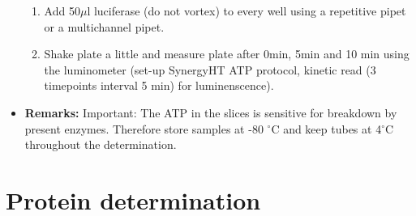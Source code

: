 \documentclass{EU-report}
\begin{document}
\begin{itemize}
\begin{enumerate}
\item Add 50$\mu$l luciferase (do not vortex) to every well using a repetitive pipet or a multichannel pipet.
\item Shake plate a little and measure plate after 0min, 5min and 10 min using the luminometer (set-up SynergyHT ATP protocol, kinetic read (3 timepoints interval 5 min) for luminenscence).
\end{enumerate}
\item \textbf{Remarks:} Important: The ATP in the slices is sensitive for breakdown by present enzymes. Therefore store samples at -80 $^{\circ}$C and keep tubes at 4$^{\circ}$C throughout the determination.
\end{itemize}

\section{Protein determination}
\label{protein}
\end{document}
